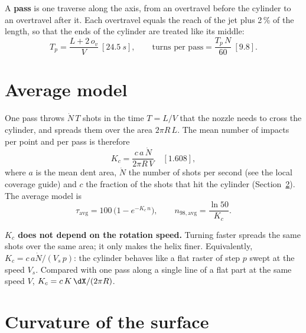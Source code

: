 \documentclass[11pt,a4paper]{article}
\begin{document}
A \textbf{pass} is one traverse along the axis, from an overtravel before the cylinder to an overtravel after it. Each overtravel equals the reach of the jet plus 2\,\% of the length, so that the ends of the cylinder are treated like its middle:
\begin{equation}
T_p=\frac{L+2\,o_v}{V}\ [\SI{24.5}{s}],\qquad\text{turns per pass}=\frac{T_p\,N}{60}\ [9.8].
\end{equation}

\section{Average model}

One pass throws $\dot N\,T$ shots in the time $T=L/V$ that the nozzle needs to cross the cylinder, and spreads them over the area $2\pi R\,L$. The mean number of impacts per point and per pass is therefore
\begin{equation}
\boxed{K_c=\frac{c\,a\,\dot N}{2\pi R\,V}}\quad[1.608],
\end{equation}
where $a$ is the mean dent area, $\dot N$ the number of shots per second (see the local coverage guide) and $c$ the fraction of the shots that hit the cylinder (Section~\ref{sec:curv}). The average model is
\begin{equation}
\tau_{\text{avg}}=100\,\bigl(1-e^{-K_c\,n}\bigr),\qquad n_{98,\text{avg}}=\frac{\ln 50}{K_c}.
\end{equation}
\begin{keybox}
\textbf{$K_c$ does not depend on the rotation speed.} Turning faster spreads the same shots over the same area; it only makes the helix finer. Equivalently, $K_c=c\,a\dot N/(V_s\,p)$: the cylinder behaves like a flat raster of step $p$ swept at the speed $V_s$. Compared with one pass along a single line of a flat part at the same speed $V$, $K_c=c\,K\,\dX/(2\pi R)$.
\end{keybox}

\section{Curvature of the surface}\label{sec:curv}
\end{document}

